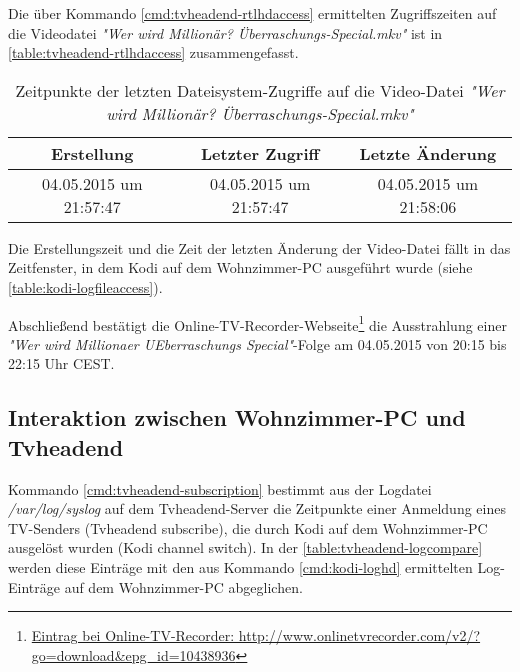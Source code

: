 Die über Kommando \autoref{cmd:tvheadend-rtlhdaccess} ermittelten Zugriffszeiten auf die Videodatei \textit{"Wer wird Millionär? Überraschungs-Special.mkv"} ist in \autoref{table:tvheadend-rtlhdaccess} zusammengefasst.

\begin{table}[H]
\begin{tabular}{ccc}
\hline 
Erstellung & Letzter Zugriff & Letzte Änderung \\ 
\hline 
04.05.2015 um 21:57:47 & 04.05.2015 um 21:57:47 & 04.05.2015 um 21:58:06 \\ 
\hline 
\end{tabular}
\caption{Zeitpunkte der letzten Dateisystem-Zugriffe auf die Video-Datei \textit{"Wer wird Millionär? Überraschungs-Special.mkv"}}
\label{table:tvheadend-rtlhdaccess}
\end{table}

Die Erstellungszeit und die Zeit der letzten Änderung der Video-Datei fällt in das Zeitfenster, in dem Kodi auf dem Wohnzimmer-PC ausgeführt wurde (siehe \autoref{table:kodi-logfileaccess}).

Abschließend bestätigt die Online-TV-Recorder-Webseite\footnote{\href{http://www.onlinetvrecorder.com/v2/?go=download\&epg\_id=10438936}{Eintrag bei Online-TV-Recorder: http://www.onlinetvrecorder.com/v2/?go=download\&epg\_id=10438936}} die Ausstrahlung einer \textit{"Wer wird Millionaer UEberraschungs Special"}-Folge am 04.05.2015 von 20:15 bis 22:15 Uhr CEST.

\subsection{Interaktion zwischen Wohnzimmer-PC und Tvheadend}

Kommando \autoref{cmd:tvheadend-subscription} bestimmt aus der Logdatei \textit{/var/log/syslog} auf dem Tvheadend-Server die Zeitpunkte einer Anmeldung eines TV-Senders (Tvheadend subscribe), die durch Kodi auf dem Wohnzimmer-PC ausgelöst wurden (Kodi channel switch). In der \autoref{table:tvheadend-logcompare} werden diese Einträge mit den aus Kommando \autoref{cmd:kodi-loghd} ermittelten Log-Einträge auf dem Wohnzimmer-PC abgeglichen.

